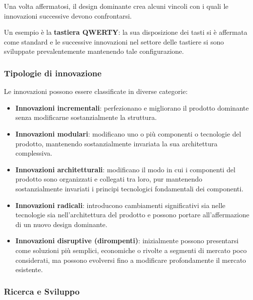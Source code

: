 \medskip

\noindent Una volta affermatosi, il design dominante crea alcuni vincoli con i quali le innovazioni successive devono confrontarsi.

\medskip

\noindent Un esempio è la \textbf{tastiera QWERTY}: la sua disposizione dei tasti si è affermata come standard e le successive innovazioni nel settore delle tastiere si 
sono sviluppate prevalentemente mantenendo tale configurazione.

\subsubsection*{Tipologie di innovazione}

\noindent Le innovazioni possono essere classificate in diverse categorie:

\begin{itemize}
    \item \textbf{Innovazioni incrementali}: perfezionano e migliorano il prodotto dominante senza modificarne sostanzialmente la struttura.

    \item \textbf{Innovazioni modulari}: modificano uno o più componenti o tecnologie del prodotto, mantenendo sostanzialmente invariata la sua architettura complessiva.

    \item \textbf{Innovazioni architetturali}: modificano il modo in cui i componenti del prodotto sono organizzati e collegati tra loro, pur mantenendo sostanzialmente 
    invariati i principi tecnologici fondamentali dei componenti.

    \item \textbf{Innovazioni radicali}: introducono cambiamenti significativi sia nelle tecnologie sia nell'architettura del prodotto e possono portare all'affermazione 
    di un nuovo design dominante.

    \item \textbf{Innovazioni disruptive (dirompenti)}: inizialmente possono presentarsi come soluzioni più semplici, economiche o rivolte a segmenti di mercato 
    poco considerati, ma possono evolversi fino a modificare profondamente il mercato esistente.
\end{itemize}

\subsubsection*{Ricerca e Sviluppo}

